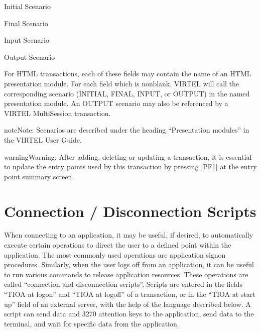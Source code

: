\documentclass[letterpaper,10pt,english]{sphinxmanual}
\begin{document}
\sphinxAtStartPar
Initial Scenario

\sphinxAtStartPar
Final Scenario

\sphinxAtStartPar
Input Scenario

\sphinxAtStartPar
Output Scenario

\sphinxAtStartPar
For HTML transactions, each of these fields may contain the name of an HTML presentation module. For each field which is non\sphinxhyphen{}blank, VIRTEL will call the corresponding scenario (INITIAL, FINAL, INPUT, or OUTPUT) in the named presentation module. An OUTPUT scenario may also be referenced by a VIRTEL Multi\sphinxhyphen{}Session transaction.

\begin{sphinxadmonition}{note}{Note:}
\sphinxAtStartPar
Scenarios are described under the heading “Presentation modules” in the VIRTEL User Guide.
\end{sphinxadmonition}

\begin{sphinxadmonition}{warning}{Warning:}
\sphinxAtStartPar
After adding, deleting or updating a transaction, it is essential to update the entry points used by this transaction by pressing {[}PF1{]} at the entry point summary screen.
\end{sphinxadmonition}

\ignorespaces 

\chapter{Connection / Disconnection Scripts}
\label{\detokenize{connectivity_guide:connection-disconnection-scripts}}\label{\detokenize{connectivity_guide:index-119}}
\sphinxAtStartPar
When connecting to an application, it may be useful, if desired, to automatically execute certain operations to direct the user to a defined point within the application. The most commonly used operations are application signon procedures. Similarly, when the user logs off from an application, it can be useful to run various commands to release application resources. These operations are called “connection and disconnection scripts”. Scripts are entered in the fields “TIOA at logon” and “TIOA at logoff” of a transaction, or in the “TIOA at start up” field of an external server, with the help of the language described below. A script can send data and 3270 attention keys to the application, send data to the terminal, and wait for specific data from the application.
\end{document}
